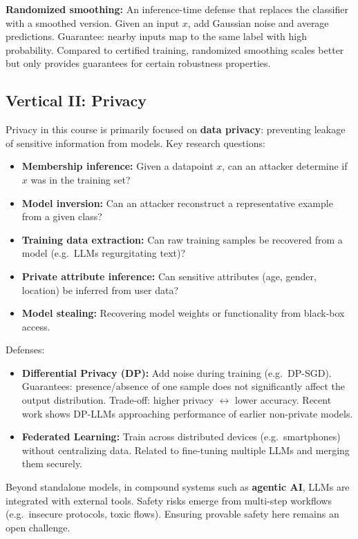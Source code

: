 \documentclass[11pt]{article}
\begin{document}
\textbf{Randomized smoothing:} An inference-time defense that replaces the classifier with a smoothed version.  
Given an input $x$, add Gaussian noise and average predictions.  
Guarantee: nearby inputs map to the same label with high probability.  
Compared to certified training, randomized smoothing scales better but only provides guarantees for certain robustness properties.


\subsection{Vertical II: Privacy}
\label{sub:privacy_intro}
Privacy in this course is primarily focused on \textbf{data privacy}: preventing leakage of sensitive information from models. Key research questions:

\begin{itemize}
	\item \textbf{Membership inference:} Given a datapoint $x$, can an attacker determine if $x$ was in the training set?
	\item \textbf{Model inversion:} Can an attacker reconstruct a representative example from a given class?
	\item \textbf{Training data extraction:} Can raw training samples be recovered from a model (e.g.\ LLMs regurgitating text)?
	\item \textbf{Private attribute inference:} Can sensitive attributes (age, gender, location) be inferred from user data?  
	\item \textbf{Model stealing:} Recovering model weights or functionality from black-box access.
\end{itemize}

Defenses:
\begin{itemize}
	\item \textbf{Differential Privacy (DP):} Add noise during training (e.g.\ DP-SGD).  
	      Guarantees: presence/absence of one sample does not significantly affect the output distribution.  
	      Trade-off: higher privacy $\leftrightarrow$ lower accuracy. Recent work shows DP-LLMs approaching performance of earlier non-private models.
	\item \textbf{Federated Learning:} Train across distributed devices (e.g.\ smartphones) without centralizing data.  
	      Related to fine-tuning multiple LLMs and merging them securely.
\end{itemize}

Beyond standalone models, in compound systems such as \textbf{agentic AI}, LLMs are integrated with external tools. Safety risks emerge from multi-step workflows (e.g.\ insecure protocols, toxic flows). Ensuring provable safety here remains an open challenge.
\end{document}
